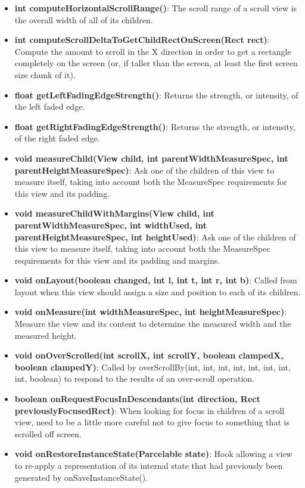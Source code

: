 \documentclass{report}
\begin{document}
\begin{itemize}
\begin{itemize}
\begin{itemize}
                \item \textbf{int	computeHorizontalScrollRange()}: The scroll range of a scroll view is the overall width of all of its children.
                \item \textbf{int	computeScrollDeltaToGetChildRectOnScreen(Rect rect)}: Compute the amount to scroll in the X direction in order to get a rectangle completely on the screen (or, if taller than the screen, at least the first screen size chunk of it).
                \item \textbf{float	getLeftFadingEdgeStrength()}: Returns the strength, or intensity, of the left faded edge.
                \item \textbf{float	getRightFadingEdgeStrength()}: Returns the strength, or intensity, of the right faded edge.
                \item \textbf{void	measureChild(View child, int parentWidthMeasureSpec, int parentHeightMeasureSpec)}: Ask one of the children of this view to measure itself, taking into account both the MeasureSpec requirements for this view and its padding.
                \item \textbf{void	measureChildWithMargins(View child, int parentWidthMeasureSpec, int widthUsed, int parentHeightMeasureSpec, int heightUsed)}: Ask one of the children of this view to measure itself, taking into account both the MeasureSpec requirements for this view and its padding and margins.
                \item \textbf{void	onLayout(boolean changed, int l, int t, int r, int b)}: Called from layout when this view should assign a size and position to each of its children.
                \item \textbf{void	onMeasure(int widthMeasureSpec, int heightMeasureSpec)}: Measure the view and its content to determine the measured width and the measured height.
                \item \textbf{void	onOverScrolled(int scrollX, int scrollY, boolean clampedX, boolean clampedY)}: Called by overScrollBy(int, int, int, int, int, int, int, int, boolean) to respond to the results of an over-scroll operation.
                \item \textbf{boolean	onRequestFocusInDescendants(int direction, Rect previouslyFocusedRect)}: When looking for focus in children of a scroll view, need to be a little more careful not to give focus to something that is scrolled off screen.
                \item \textbf{void	onRestoreInstanceState(Parcelable state)}: Hook allowing a view to re-apply a representation of its internal state that had previously been generated by onSaveInstanceState().

\end{itemize}
\end{itemize}
\end{itemize}
\end{document}
